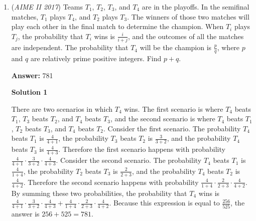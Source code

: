 \begin{enumerate}
 Solution by IronicNinja~

 



\textbf{Solution 5 (Solution 1, but a little different, using PIE)}

PIE is the principle of inclusion and exclusion. Denote $\{1, 2, 3, 4, 5, 6, 7, 8\}$ as set $T$, $\{1, 2, 3, 4, 5\}$ as set $A$, and $\{4, 5, 6, 7, 8\}$ as set $B$. We want to find the number of subsets of $T$ that are not subsets of $A$ or $B$ (i.e., subsets contained in $T$ but not in $A \cup B$). Hence, the desired number is $|T| - |A \cup B|$.

 By PIE, $|A \cup B| = |A| + |B| - |A \cap B|$. Notice that $A \cap B = \{4, 5\}$, so $|A \cap B| = 4$ (the number of subsets of $\{4,5\}$). Both $A$ and $B$ contain $2^5 = 32$ subsets, and $T$ contains $2^8 = 256$ subsets. The final answer is therefore
 \[256 - (32 + 32 - 4) = 256 - 60 = \boxed{196}.\]



	\item (\textit{AIME II 2017}) Teams $T_1$, $T_2$, $T_3$, and $T_4$ are in the playoffs. In the semifinal matches, $T_1$ plays $T_4$, and $T_2$ plays $T_3$. The winners of those two matches will play each other in the final match to determine the champion. When $T_i$ plays $T_j$, the probability that $T_i$ wins is $\frac{i}{i+j}$, and the outcomes of all the matches are independent. The probability that $T_4$ will be the champion is $\frac{p}{q}$, where $p$ and $q$ are relatively prime positive integers. Find $p+q$.


 
 \textbf{Answer: }781



\textbf{Solution 1}

There are two scenarios in which $T_4$ wins. The first scenario is where $T_4$ beats $T_1$, $T_3$ beats $T_2$, and $T_4$ beats $T_3$, and the second scenario is where $T_4$ beats $T_1$, $T_2$ beats $T_3$, and $T_4$ beats $T_2$. Consider the first scenario. The probability $T_4$ beats $T_1$ is $\frac{4}{4+1}$, the probability $T_3$ beats $T_2$ is $\frac{3}{3+2}$, and the probability $T_4$ beats $T_3$ is $\frac{4}{4+3}$. Therefore the first scenario happens with probability $\frac{4}{4+1}\cdot\frac{3}{3+2}\cdot\frac{4}{4+3}$. Consider the second scenario. The probability $T_4$ beats $T_1$ is $\frac{4}{1+4}$, the probability $T_2$ beats $T_3$ is $\frac{2}{2+3}$, and the probability $T_4$ beats $T_2$ is $\frac{4}{4+2}$. Therefore the second scenario happens with probability $\frac{4}{1+4}\cdot\frac{2}{2+3}\cdot\frac{4}{4+2}$. By summing these two probabilities, the probability that $T_4$ wins is $\frac{4}{4+1}\cdot\frac{3}{3+2}\cdot\frac{4}{4+3}+\frac{4}{1+4}\cdot\frac{2}{2+3}\cdot\frac{4}{4+2}$. Because this expression is equal to $\frac{256}{525}$, the answer is $256+525=\boxed{781}$.


\end{enumerate}
